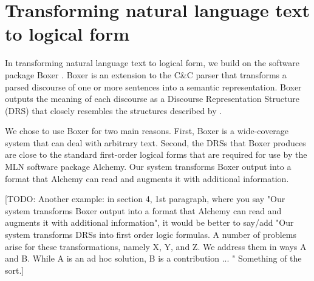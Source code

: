 \section{Transforming natural language text to logical form}

In transforming natural language text to logical form, we build on the software
package Boxer \citep{bos:coling2004}. Boxer
is an extension to the C\&C parser \citep{clark:acl04} that transforms a parsed
discourse of one or more sentences into a semantic representation.  Boxer
outputs the meaning of each discourse as a Discourse Representation Structure
(DRS) that closely resembles the structures described by \citet{kamp:book93}.

We chose to use Boxer for two main reasons.  First, Boxer is a wide-coverage
system that can deal with arbitrary text.
Second, the DRSs that Boxer produces are close to the standard first-order
logical forms that are required for use by the MLN software package Alchemy. 
Our system transforms Boxer output into a format that Alchemy can read and
augments it with additional information.

[TODO: Another example: in section 4, 1st paragraph, where you say "Our system
transforms Boxer output into a format that Alchemy can read and augments it with
additional information", it would be better to say/add "Our system transforms
DRSs into first order logic formulas. A number of problems arise for these
transformations, namely X, Y, and Z. We address them in ways A and B. While A is
an ad hoc solution, B is a contribution ... " Something of the sort.]
